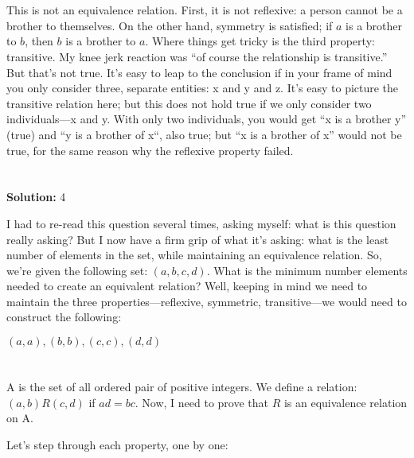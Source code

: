 \documentclass{article}
\begin{document}
\section{}

This is not an equivalence relation. First, it is not reflexive: a person cannot be a brother to themselves. On the other hand, symmetry is satisfied; if $a$ is a brother to $b$, then $b$ is a brother to $a$. Where things get tricky is the third property: transitive. My knee jerk reaction was ``of course the relationship is transitive.'' But that's not true. It's easy to leap to the conclusion if in your frame of mind you only consider three, separate entities: x and y and z. It's easy to picture the transitive relation here; but this does not hold true if we only consider two individuals—x and y. With only two individuals, you would get ``x is a brother y'' (true)  and ``y is a brother of x``, also true; but ``x is a brother of x'' would not be true, for the same reason why the reflexive property failed. 

\section{}

\textbf{Solution:} 4

I had to re-read this question several times, asking myself: what is this question really asking? But I now have a firm grip of what it's asking: what is the least number of elements in the set, while maintaining an equivalence relation. So, we're given the following set: $({a,b,c,d})$. What is the minimum number elements needed to create an equivalent relation? Well, keeping in mind we need to maintain the three properties—reflexive, symmetric, transitive—we would need to construct the following:

${(a,a), (b,b), (c,c), (d,d)}$

\section{}

\subsection{}

A is the set of all ordered pair of positive integers. We define a relation: $(a,b)R(c,d)$ if  $ad = bc$. Now, I need to prove that $R$ is an equivalence relation on A.


Let's step through each property, one by one:
\end{document}

